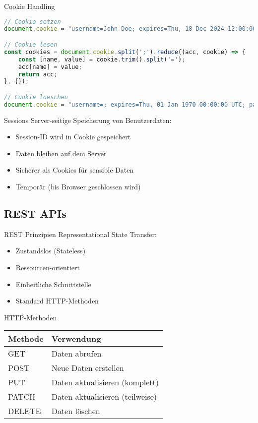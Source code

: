 \begin{KR}{Cookie Handling}
\begin{lstlisting}[language=JavaScript, style=basesmol]
// Cookie setzen
document.cookie = "username=John Doe; expires=Thu, 18 Dec 2024 12:00:00 UTC; path=/";

// Cookie lesen
const cookies = document.cookie.split(';').reduce((acc, cookie) => {
    const [name, value] = cookie.trim().split('=');
    acc[name] = value;
    return acc;
}, {});

// Cookie loeschen
document.cookie = "username=; expires=Thu, 01 Jan 1970 00:00:00 UTC; path=/;";
\end{lstlisting}
\end{KR}

\begin{concept}{Sessions}
    Server-seitige Speicherung von Benutzerdaten:
    \begin{itemize}
        \item Session-ID wird in Cookie gespeichert
        \item Daten bleiben auf dem Server
        \item Sicherer als Cookies für sensible Daten
        \item Temporär (bis Browser geschlossen wird)
    \end{itemize}
\end{concept}

\subsection{REST APIs}

\begin{definition}{REST Prinzipien}
    Representational State Transfer:
    \begin{itemize}
        \item Zustandslos (Stateless)
        \item Ressourcen-orientiert
        \item Einheitliche Schnittstelle
        \item Standard HTTP-Methoden
    \end{itemize}
\end{definition}

\begin{theorem}{HTTP-Methoden}
    \begin{center}
    \begin{tabular}{|l|l|}
    \hline
    Methode & Verwendung \\
    \hline
    GET & Daten abrufen \\
    \hline
    POST & Neue Daten erstellen \\
    \hline
    PUT & Daten aktualisieren (komplett) \\
    \hline
    PATCH & Daten aktualisieren (teilweise) \\
    \hline
    DELETE & Daten löschen \\
    \hline
    \end{tabular}
    \end{center}
\end{theorem}

